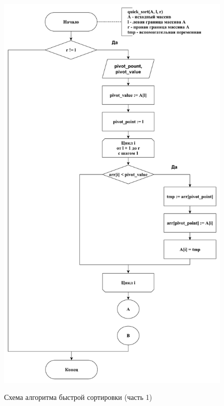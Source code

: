 \documentclass[a4paper,12pt]{article}
\begin{document}
        
        \begin{figure}[h!]
        	\begin{center}
        		{\includegraphics[scale = 0.47]{schema02.pdf}}
        		\caption{Схема алгоритма быстрой сортировки (часть 1)}
        		\label{fig:schema_quick_sort_1}
        	\end{center}
        \end{figure}
        
\end{document}
